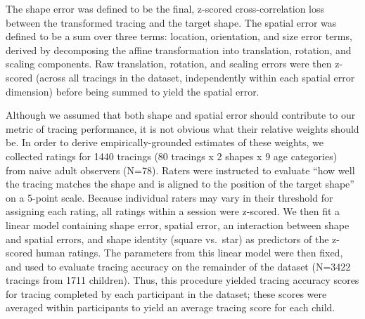 \documentclass[10pt, letterpaper]{article}
\begin{document}
The shape error was defined to be the final, z-scored cross-correlation
loss between the transformed tracing and the target shape. The spatial
error was defined to be a sum over three terms: location, orientation,
and size error terms, derived by decomposing the affine transformation
into translation, rotation, and scaling components. Raw translation,
rotation, and scaling errors were then z-scored (across all tracings in
the dataset, independently within each spatial error dimension) before
being summed to yield the spatial error.

Although we assumed that both shape and spatial error should contribute
to our metric of tracing performance, it is not obvious what their
relative weights should be. In order to derive empirically-grounded
estimates of these weights, we collected ratings for 1440 tracings (80
tracings x 2 shapes x 9 age categories) from naive adult observers
(N=78). Raters were instructed to evaluate ``how well the tracing
matches the shape and is aligned to the position of the target shape''
on a 5-point scale. Because individual raters may vary in their
threshold for assigning each rating, all ratings within a session were
z-scored. We then fit a linear model containing shape error, spatial
error, an interaction between shape and spatial errors, and shape
identity (square vs.~star) as predictors of the z-scored human ratings.
The parameters from this linear model were then fixed, and used to
evaluate tracing accuracy on the remainder of the dataset (N=3422
tracings from 1711 children). Thus, this procedure yielded tracing
accuracy scores for tracing completed by each participant in the
dataset; these scores were averaged within participants to yield an
average tracing score for each child.
\end{document}
